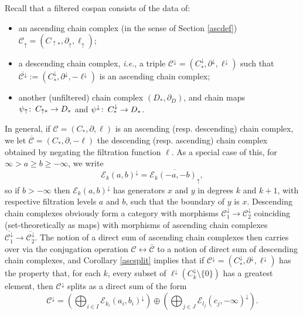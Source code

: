 \documentclass[11pt]{amsart}
\theoremstyle{definition}
\theoremstyle{remark}
\numberwithin{equation}{section}
\def\co{\colon\thinspace}
\begin{document}
Recall that a filtered cospan consists of the data of:\begin{itemize}
	\item an ascending chain complex (in the sense of Section \ref{ascdef}) $\mathcal{C}_{\uparrow}=(C_{\uparrow *},\partial_{\uparrow},\ell_{\uparrow})$; 
	\item a descending chain complex, \emph{i.e.}, a triple $\mathcal{C}^{\downarrow}=(C^{\downarrow}_{*},\partial^{\downarrow},\ell^{\downarrow})$ such that $\overline{\mathcal{C}^{\downarrow}}:=(C^{\downarrow}_{*},\partial^{\downarrow},-\ell^{\downarrow})$ is an ascending chain complex;
	\item another (unfiltered) chain complex $(D_*,\partial_D)$, and chain maps $\psi_{\uparrow}\co C_{\uparrow *}\to D_*$ and $\psi^{\downarrow}\co C^{\downarrow}_{*}\to D_*$.\end{itemize}

In general, if $\mathcal{C}=(C_*,\partial,\ell)$ is an ascending (resp. descending) chain complex, we let $\overline{\mathcal{C}}=(C_*,\partial,-\ell)$ the descending (resp. ascending) chain complex obtained by negating the filtration function $\ell$.  As a special case of this, for $\infty>a\geq b\geq -\infty$, we write \[ \mathcal{E}_{k}(a,b)^{\downarrow}=\overline{\mathcal{E}_k(-a,-b)_{\uparrow}},\] so if $b>-\infty$ then $\mathcal{E}_{k}(a,b)^{\downarrow}$ has generators $x$ and $y$ in degrees $k$ and $k+1$, with respective filtration levels $a$ and  $b$, such that the boundary of $y$ is $x$. Descending chain complexes obviously form a category with morphisms $\mathcal{C}^{\downarrow}_{1}\to \mathcal{C}^{\downarrow}_{2}$ coinciding (set-theoretically as maps) with morphisms of ascending chain complexes $\overline{\mathcal{C}^{\downarrow}_{1}}\to\overline{\mathcal{C}^{\downarrow}_{2}}$.  The notion of a direct sum of ascending chain complexes then carries over via the conjugation operation $\mathcal{C}\leftrightarrow\bar{\mathcal{C}}$ to a notion of direct sum of descending chain complexes, and  Corollary \ref{ascsplit} implies that if $\mathcal{C}^{\downarrow}=(C^{\downarrow}_{*},\partial^{\downarrow},\ell^{\downarrow})$ has the property that, for each $k$, every subset of $\ell^{\downarrow}(C^{\downarrow}_{k}\setminus\{0\})$ has a greatest element, then $\mathcal{C}^{\downarrow}$ splits as a direct sum of the form \begin{equation}\label{descsplit} \mathcal{C}^{\downarrow}=\left(\bigoplus_{i\in I} \mathcal{E}_{k_i}(a_i,b_i)^{\downarrow}\right)\oplus\left(\bigoplus_{j\in J} \mathcal{E}_{l_j}(c_j,-\infty)^{\downarrow} \right).\end{equation}
\end{document}

